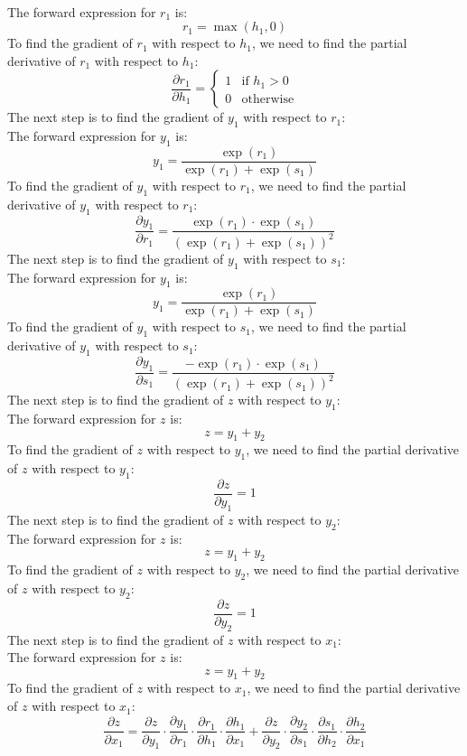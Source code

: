 \documentclass[a3paper,12pt]{extarticle} %
\begin{document}
\begin{enumerate}
\begin{enumerate}
\\ The forward expression for $r_1$ is:
\[
r_1 = \max(h_1, 0)
\]
To find the gradient of $r_1$ with respect to $h_1$, we need to find the partial derivative of $r_1$ with respect to $h_1$:
\[
\frac{\partial r_1}{\partial h_1} = \begin{cases} 1 & \text{if } h_1 > 0 \\ 0 & \text{otherwise} \end{cases}
\]
The next step is to find the gradient of $y_1$ with respect to $r_1$:
\\ The forward expression for $y_1$ is:
\[
y_1 = \frac{\exp(r_1)}{\exp(r_1) + \exp(s_1)}
\]
To find the gradient of $y_1$ with respect to $r_1$, we need to find the partial derivative of $y_1$ with respect to $r_1$:
\[
\frac{\partial y_1}{\partial r_1} = \frac{\exp(r_1) \cdot \exp(s_1)}{(\exp(r_1) + \exp(s_1))^2}
\]
The next step is to find the gradient of $y_1$ with respect to $s_1$:
\\ The forward expression for $y_1$ is:
\[
y_1 = \frac{\exp(r_1)}{\exp(r_1) + \exp(s_1)}
\]
To find the gradient of $y_1$ with respect to $s_1$, we need to find the partial derivative of $y_1$ with respect to $s_1$:
\[
\frac{\partial y_1}{\partial s_1} = \frac{-\exp(r_1) \cdot \exp(s_1)}{(\exp(r_1) + \exp(s_1))^2}
\]
The next step is to find the gradient of $z$ with respect to $y_1$:
\\ The forward expression for $z$ is:
\[
z = y_1 + y_2
\]
To find the gradient of $z$ with respect to $y_1$, we need to find the partial derivative of $z$ with respect to $y_1$:
\[
\frac{\partial z}{\partial y_1} = 1
\]
The next step is to find the gradient of $z$ with respect to $y_2$:
\\ The forward expression for $z$ is:
\[
z = y_1 + y_2
\]
To find the gradient of $z$ with respect to $y_2$, we need to find the partial derivative of $z$ with respect to $y_2$:
\[
\frac{\partial z}{\partial y_2} = 1
\]
The next step is to find the gradient of $z$ with respect to $x_1$:
\\ The forward expression for $z$ is:
\[
z = y_1 + y_2
\]
To find the gradient of $z$ with respect to $x_1$, we need to find the partial derivative of $z$ with respect to $x_1$:
\[
\frac{\partial z}{\partial x_1} = \frac{\partial z}{\partial y_1} \cdot \frac{\partial y_1}{\partial r_1} \cdot \frac{\partial r_1}{\partial h_1} \cdot \frac{\partial h_1}{\partial x_1} + \frac{\partial z}{\partial y_2} \cdot \frac{\partial y_2}{\partial s_1} \cdot \frac{\partial s_1}{\partial h_2} \cdot \frac{\partial h_2}{\partial x_1}
\]
\end{enumerate}
\end{enumerate}
\end{document}
